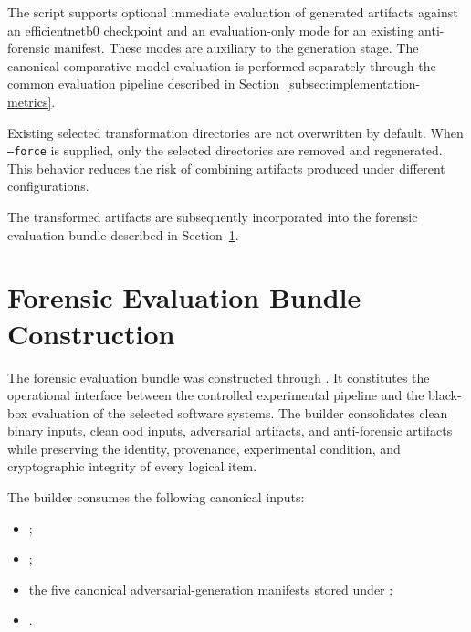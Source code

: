 The script supports optional immediate evaluation of generated artifacts against
an \gls{efficientnetb0} checkpoint and an evaluation-only mode for an existing
anti-forensic manifest. These modes are auxiliary to the generation stage. The
canonical comparative model evaluation is performed separately through
the common evaluation pipeline described in
Section~\ref{subsec:implementation-metrics}.

Existing selected transformation directories are not overwritten by default.
When \texttt{--force} is supplied, only the selected directories are removed
and regenerated. This behavior reduces the risk of combining artifacts produced
under different configurations.

The transformed artifacts are subsequently incorporated into the forensic
evaluation bundle described in
Section~\ref{sec:implementation-forensic-bundle}.

\section{Forensic Evaluation Bundle Construction}
\label{sec:implementation-forensic-bundle}

The forensic evaluation bundle was constructed through
. It
constitutes the operational interface between the controlled experimental
pipeline and the black-box evaluation of the selected software systems. The
builder consolidates clean binary inputs, clean \gls{ood} inputs, adversarial
artifacts, and anti-forensic artifacts while preserving the identity,
provenance, experimental condition, and cryptographic integrity of every
logical item.

The builder consumes the following canonical inputs:

\begin{itemize}
\item
{};

\item
{};

\item the five canonical adversarial-generation manifests stored under
;

\item
{}.
\end{itemize}


